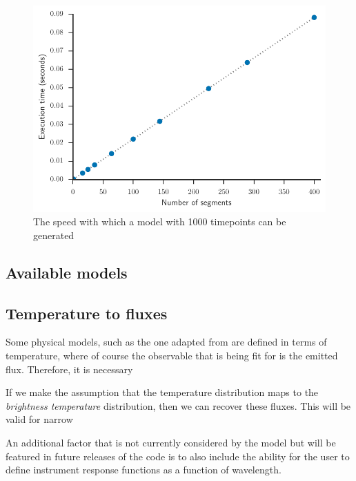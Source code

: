 \documentclass[a4paper,fleqn,usenatbib]{mnras}
\begin{document}
\begin{figure}
\begin{center}
\includegraphics[width=\columnwidth]{img/exec_time.pdf}
\caption{The speed with which a model with 1000 timepoints can be generated}
\label{fig:exec_time}
\end{center}
\end{figure}

\subsection{Available models}\label{sec:ttof}


\subsection{Temperature to fluxes}\label{sec:ttof}

Some physical models, such as the one adapted from \citep{Zhang2016} are defined in terms of temperature, where of course the observable that is being fit for is the emitted flux. Therefore, it is necessary

If we make the assumption that the temperature distribution maps to the \emph{brightness temperature} distribution, then we can recover these fluxes. This will be valid for narrow

An additional factor that is not currently considered by the model but will be featured in future releases of the code is to also include the ability for the user to define instrument response functions as a function of wavelength.

\subsection{}\label{sec:ttof}
\end{document}
